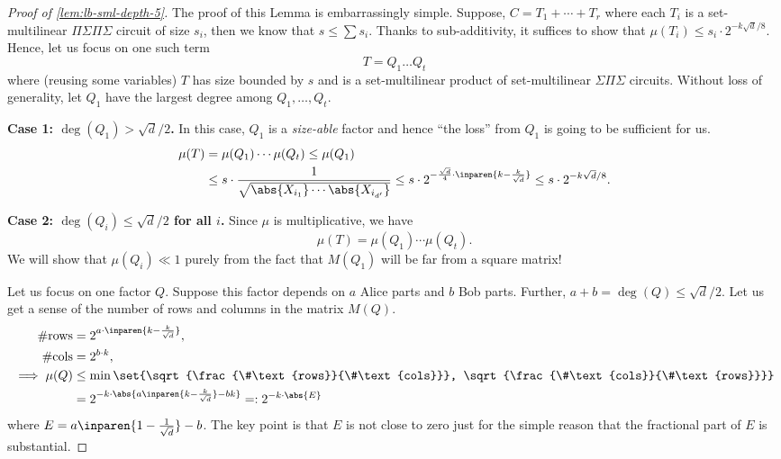 \begin{proof}[Proof of \autoref{lem:lb-sml-depth-5}] The proof of this Lemma is embarrassingly simple. Suppose, $C = T_1 +  \cdots + T_r$ where each $T_i$ is a set-multilinear $\Pi\Sigma\Pi\Sigma$ circuit of size $s_i$, then we know that $s \leq \sum s_i$. Thanks to sub-additivity, it suffices to show that $\mu(T_i) \leq s_i \cdot 2^{-k\sqrt{d}/8}$. Hence, let us focus on one such term
  \[
    T = Q_1 \ldots Q_t
  \]
  where (reusing some variables) $T$ has size bounded by $s$ and is a set-multilinear product of set-multilinear $\Sigma\Pi\Sigma$ circuits. Without loss of generality, let $Q_1$ have the largest degree among $Q_1,\ldots, Q_t$.

  \medskip

  {\bf Case 1: $\deg(Q_1) > \sqrt{d}/2$.} In this case, $Q_1$ is a \emph{size-able} factor and hence ``the loss'' from $Q_1$ is going to be sufficient for us.
  \begin{align*}
    \mu(T) & = \mu(Q_1) \cdots \mu(Q_t) \leq \mu(Q_1)\\
           & \leq s \cdot \frac{1}{\sqrt{\abs{X_{i_1}} \cdots \abs{X_{i_{d'}}}}} \leq s \cdot 2^{-\frac{\sqrt{d}}{4} \cdot \inparen{k - \frac{k}{\sqrt{d}}}} \leq s \cdot 2^{-k\sqrt{d}/8}.
  \end{align*}

  \medskip

  {\bf Case 2: $\deg(Q_i) \leq \sqrt{d}/2$ for all $i$.} Since $\mu$ is multiplicative, we have
  \[
    \mu(T)  = \mu(Q_1) \cdots \mu(Q_t).
  \]
  We will show that $\mu(Q_i) \ll 1$ purely from the fact that $M(Q_1)$ will be far from a square matrix!

  Let us focus on one factor $Q$. Suppose this factor depends on $a$ Alice parts and $b$ Bob parts. Further, $a+b = \deg(Q) \leq \sqrt{d}/2$. Let us get a sense of the number of rows and columns in the matrix $M(Q)$.
  \begin{align*}
    \#\text{rows} & = 2^{a \cdot \inparen{k - \frac{k}{\sqrt{d}}}},\\
    \#\text{cols} & = 2^{b \cdot k},\\
    \implies \mu(Q) & \leq \min \set{\sqrt{\frac{\#\text{rows}}{\#\text{cols}}}, \sqrt{\frac{\#\text{cols}}{\#\text{rows}}}}\\
                  & = 2^{- k \cdot \abs{a\inparen{k - \frac{k}{\sqrt{d}}} - bk}} =: 2^{-k \cdot \abs{E}}
  \end{align*}
  where $E = a\inparen{1 - \frac{1}{\sqrt{d}}} - b$. The key point is that $E$ is not close to zero just for the simple reason that the fractional part of $E$ is substantial.


\end{proof}
